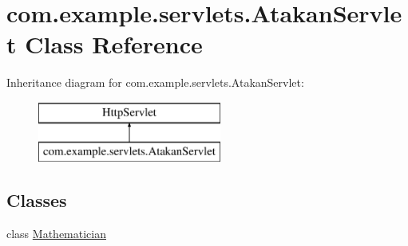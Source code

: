 \hypertarget{classcom_1_1example_1_1servlets_1_1_atakan_servlet}{}\section{com.\+example.\+servlets.\+Atakan\+Servlet Class Reference}
\label{classcom_1_1example_1_1servlets_1_1_atakan_servlet}
Inheritance diagram for com.\+example.\+servlets.\+Atakan\+Servlet\+:\begin{figure}[H]
\begin{center}
\leavevmode
\includegraphics[height=2.000000cm]{classcom_1_1example_1_1servlets_1_1_atakan_servlet}
\end{center}
\end{figure}
\subsection*{Classes}
\begin{DoxyCompactItemize}
\item 
class \hyperlink{classcom_1_1example_1_1servlets_1_1_atakan_servlet_1_1_mathematician}{Mathematician}
\end{DoxyCompactItemize}
